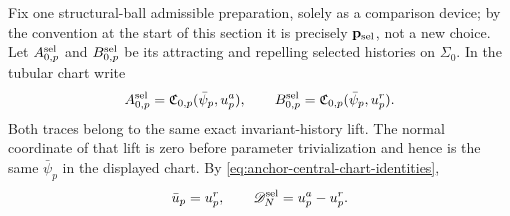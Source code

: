 Fix one structural-ball admissible preparation, solely as a comparison
device; by the convention at the start of this section it is precisely
\(\mathbf p_{\rm sel}\), not a new choice.  Let
\(A^{\rm sel}_{0,p}\) and \(B^{\rm sel}_{0,p}\) be its attracting and
repelling selected histories on \(\Sigma_0\).  In the tubular chart write
\[
 A^{\rm sel}_{0,p}=\mathfrak C_{0,p}(\bar\psi_p,u^a_p),
 \qquad
 B^{\rm sel}_{0,p}=\mathfrak C_{0,p}(\bar\psi_p,u^r_p).
\]
Both traces belong to the same exact invariant-history lift.  The normal
coordinate of that lift is zero before parameter trivialization and hence
is the same \(\bar\psi_p\) in the displayed chart.  By
\cref{eq:anchor-central-chart-identities},
\begin{equation}
 \bar u_p=u_p^r,\qquad
 \mathscr D_N^{\rm sel}=u^a_p-u^r_p.
 \label{eq:lean-anchor-selected-gap-coordinate}
\end{equation}


